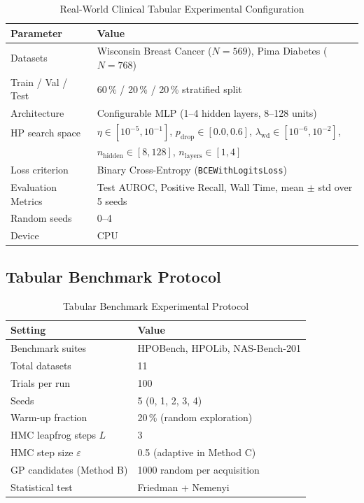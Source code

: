 \documentclass[11pt]{article}
\theoremstyle{definition}
\begin{document}
\begin{table}[H]
\centering
\caption{Real-World Clinical Tabular Experimental Configuration}
\label{tab:clinical_setup}
\renewcommand{\arraystretch}{1.2}
\begin{tabular}{ll}
\toprule
Parameter & Value \\
\midrule
Datasets             & Wisconsin Breast Cancer ($N=569$), Pima Diabetes ($N=768$) \\
Train / Val / Test   & 60\,\% / 20\,\% / 20\,\% stratified split \\
Architecture         & Configurable MLP (1--4 hidden layers, 8--128 units) \\
HP search space      & $\eta\in[10^{-5},10^{-1}]$,
                       $p_{\mathrm{drop}}\in[0.0,0.6]$,
                       $\lambda_{\mathrm{wd}}\in[10^{-6},10^{-2}]$, \\
                     & $n_{\mathrm{hidden}}\in[8,128]$,
                       $n_{\mathrm{layers}}\in[1,4]$ \\
Loss criterion       & Binary Cross-Entropy (\texttt{BCEWithLogitsLoss}) \\
Evaluation Metrics   & Test AUROC, Positive Recall, Wall Time, mean $\pm$ std over 5 seeds \\
Random seeds         & 0--4 \\
Device               & CPU \\
\bottomrule
\end{tabular}
\end{table}

\subsection{Tabular Benchmark Protocol}
\begin{table}[H]
\centering
\caption{Tabular Benchmark Experimental Protocol}
\label{tab:tabular_protocol}
\renewcommand{\arraystretch}{1.2}
\begin{tabular}{ll}
\toprule
Setting & Value \\
\midrule
Benchmark suites     & HPOBench, HPOLib, NAS-Bench-201 \\
Total datasets       & 11 \\
Trials per run       & 100 \\
Seeds                & 5 (0, 1, 2, 3, 4) \\
Warm-up fraction     & 20\,\% (random exploration) \\
HMC leapfrog steps $L$ & 3 \\
HMC step size $\varepsilon$ & 0.5 (adaptive in Method C) \\
GP candidates (Method B) & 1000 random per acquisition \\
Statistical test     & Friedman + Nemenyi~\cite{demsar2006} \\
\bottomrule
\end{tabular}
\end{table}
\end{document}
